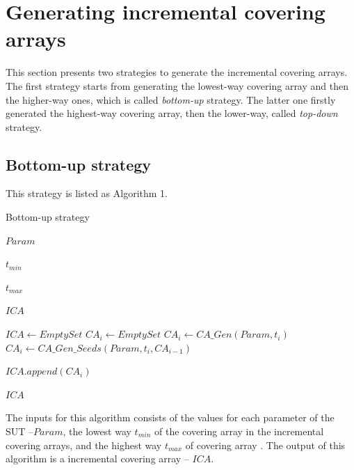 \documentclass[conference]{IEEEtran}
\theoremstyle{definition}
\begin{document}
\section{Generating incremental covering arrays}
This section presents two strategies to generate the incremental covering arrays. The first strategy starts from generating the lowest-way covering array and then the higher-way ones, which is called \emph{bottom-up} strategy. The latter one firstly generated the highest-way covering array, then the lower-way, called \emph{top-down} strategy.

\subsection{Bottom-up strategy}
This strategy is listed as Algorithm 1.
\begin{algorithm}
  \caption{Bottom-up strategy}
  \begin{algorithmic}[1]
     \Require
     $Param$ 

     $t_{min}$ 

     $t_{max}$ 

     \Ensure  $ICA$ 

      \State $ICA \leftarrow Empty Set$
         \State $CA_{i} \leftarrow  Empty Set $
                \State $CA_{i} \leftarrow CA\_Gen(Param, t_{i})$
         \Else
             \State $CA_{i} \leftarrow CA\_Gen\_Seeds(Param, t_{i}, CA_{i - 1})$
        \EndIf

        \State $ICA.append(CA_{i})$
      \EndFor

     \State \Return $ICA$
  \end{algorithmic}
\end{algorithm}
The inputs for this algorithm consists of the values for each parameter of the SUT --$Param$,  the lowest way $t_{min}$ of the covering array in the incremental covering arrays, and the highest way $t_{max}$ of covering array . The output of this algorithm is a incremental covering array -- $ICA$.
\end{document}
